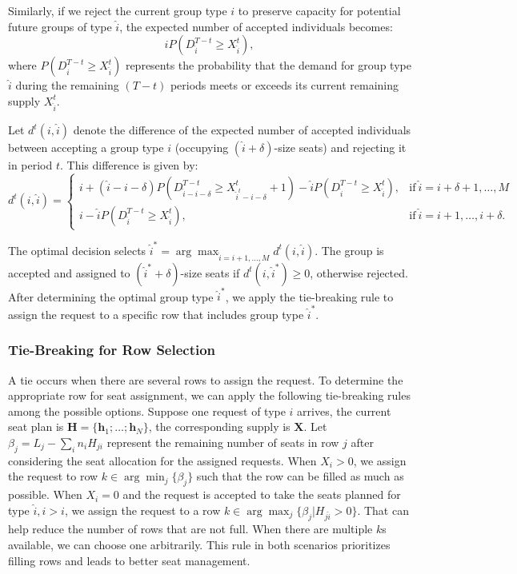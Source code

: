 Similarly, if we reject the current group type $i$ to preserve capacity for potential future groups of type $\hat{i}$, the expected number of accepted individuals becomes: $$\hat{i} P(D_{\hat{i}}^{T-t} \geq X_{\hat{i}}^{t}),$$ where $P(D_{\hat{i}}^{T-t} \geq X_{\hat{i}}^{t})$ represents the probability that the demand for group type $\hat{i}$ during the remaining $(T-t)$ periods meets or exceeds its current remaining supply $X_{\hat{i}}^{t}$.

Let $d^{t}({i},\hat{i})$ denote the difference of the expected number of accepted individuals between accepting a group type ${i}$ (occupying $(\hat{i}+\delta)$-size seats) and rejecting it in period $t$. This difference is given by:
\begin{equation*}
	d^{t}({i},\hat{i}) = \begin{cases}
    {i} + (\hat{i}-{i}-\delta)P(D_{\hat{i}-{i}-\delta}^{T-t} \geq X_{\hat{i}^{t}-{i}-\delta}^{t}+1) - \hat{i} P(D_{\hat{i}}^{T-t} \geq X_{\hat{i}}^{t}), &\text{if}~ \hat{i} = {i}+\delta+1, \ldots, M \\
    {i} - \hat{i} P(D_{\hat{i}}^{T-t} \geq X_{\hat{i}}^{t}), &\text{if}~ \hat{i} = {i}+1, \ldots, {i}+\delta.
		\end{cases}
\end{equation*}

The optimal decision selects $\hat{i}^{*} = \arg \max_{\hat{i} = {i}+1, \ldots, M} d^{t}({i},\hat{i})$. The group is accepted and assigned to $(\hat{i}^{*} + \delta)$-size seats if $d^{t}({i},\hat{i}^{*}) \geq 0$, otherwise rejected. After determining the optimal group type $\hat{i}^{*}$, we apply the tie-breaking rule to assign the request to a specific row that includes group type $\hat{i}^{*}$.


\subsubsection*{Tie-Breaking for Row Selection}\label{tie-break}
A tie occurs when there are several rows to assign the request. To determine the appropriate row for seat assignment, we can apply the following tie-breaking rules among the possible options. Suppose one request of type ${i}$ arrives, the current seat plan is $\bm{H} = \{\bm{h}_{1}; \ldots; \bm{h}_{N}\}$, the corresponding supply is $\bm{X}$. Let $\beta_{j} = L_j - \sum_{i} n_{i} H_{ji}$ represent the remaining number of seats in row $j$ after considering the seat allocation for the assigned requests. When $X_{i} > 0$, we assign the request to row $k \in \arg \min_{j} \{\beta_{j}\}$ such that the row can be filled as much as possible. When $X_{i} = 0$ and the request is accepted to take the seats planned for type $\hat{i}, \hat{i}>i$, we assign the request to a row $k \in \arg \max_{j} \{\beta_{j}| H_{j \hat{i}}>0\}$. That can help reduce the number of rows that are not full. When there are multiple $k$s available, we can choose one arbitrarily. This rule in both scenarios prioritizes filling rows and leads to better seat management.


